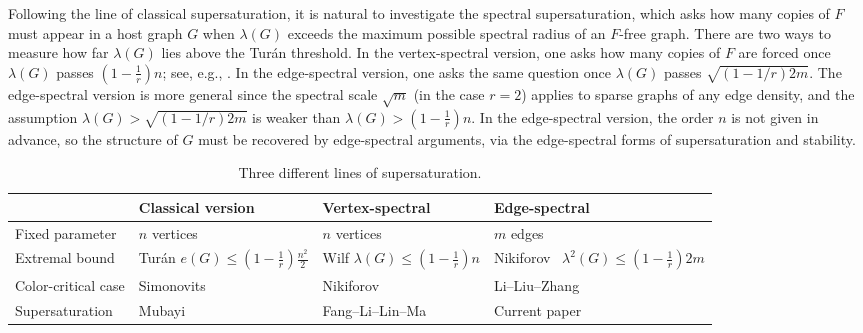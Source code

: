 \documentclass[11pt,a4paper]{article}
\theoremstyle{definition}
\theoremstyle{plain}
\renewcommand{\le}{\leqslant}
\begin{document}
\smallskip 
Following the line of classical supersaturation, it is natural to investigate the spectral supersaturation, which asks how
many copies of $F$ must appear in a host graph $G$ when  $\lambda(G)$ exceeds the maximum possible spectral radius of an $F$-free graph.  
There are two ways to measure how far 
$\lambda (G)$ lies above the Tur\'an threshold. In the vertex-spectral version, 
one asks how many copies of $F$ are forced once
$\lambda(G)$ passes $(1-\frac1r )n$; 
see, e.g., \cite{LFP2024, FLLM2025, FLL2025}.  
 In the edge-spectral version, 
one asks the same question once $\lambda(G)$ passes $\sqrt{(1\!-\! 1/ r)2m}$.
The edge-spectral version is more general since  
the spectral scale $\sqrt m$ (in the case $r=2$) applies to sparse graphs of any edge density, and the assumption $ \lambda (G) >\sqrt{(1\!-\!1/r)2m}$ is weaker than $\lambda (G) > (1- \frac{1}{r})n$. In the edge-spectral version, 
the order $n$ is not given in advance, 
so the structure of $G$ must be recovered by edge-spectral arguments, via the edge-spectral forms of supersaturation and stability.


\begin{table}[htbp]
\centering
\renewcommand{\arraystretch}{1.25}
\begin{tabular}{@{}l p{} p{} p{}@{}}
\hline
 & {Classical version} &{Vertex-spectral} 
   &{Edge-spectral} \\
\hline
Fixed parameter
 & $n$ vertices
 & $n$ vertices
 &  $m$ edges \\[2pt]
Extremal bound
 & Tur\'an \cite{Turan1941} 
 \newline $e(G)\le (1-\frac{1}{r})\frac{n^2}{2}$
 & Wilf \cite{Wil1986} \newline 
 $\lambda(G)\le(1-\tfrac1r)n$
 &  Nikiforov~\cite{Nikiforov}  \newline $\lambda^2(G)\le (1-\tfrac1r)2m$ \\[2pt]
  Color-critical case & Simonovits~\cite{Sim1966}
 &  Nikiforov \cite{Nik2009EJC} 
 & Li--Liu--Zhang~\cite{LLZ-edge-color-critical} \\[2pt]
Supersaturation
 &   Mubayi~\cite{Mub2010} 
  & Fang--Li--Lin--Ma \cite{FLLM2025} 
 & Current paper  \\ 
\hline
\end{tabular}
\caption{Three different lines of supersaturation.}
\label{tab:three-lines}
\end{table}
\end{document}
